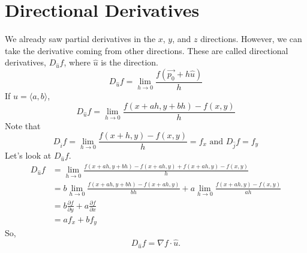 \section{Directional Derivatives}
\noindent
We already saw partial derivatives in the $x$, $y$, and $z$ directions.
However, we can take the derivative coming from other directions.
These are called directional derivatives, $D_{\hat{u}}{f}$, where $\hat{u}$ is the direction.
\begin{equation*}
	D_{\hat{u}}{f} = \lim_{h \to 0}{\frac{f(\vec{p_0} + h\hat{u})}{h}}
\end{equation*}
\noindent
If $\hat{u} = \langle a, b \rangle$, 
\begin{equation*}
	D_{\hat{u}}{f} = \lim_{h \to 0}{\frac{f(x+ah, y+bh) - f(x,y)}{h}}	
\end{equation*}
Note that
\begin{equation*}
	D_{\hat{i}}{f} = \lim_{h \to 0}{\frac{f(x+h, y) - f(x, y)}{h}} = f_x \text{ and } D_{\hat{j}}{f} = f_y	
\end{equation*}
Let's look at $D_{\hat{u}}{f}$.
\begin{align*}
	D_{\hat{u}}{f} &= \lim_{h \to 0}{\frac{f(x+ah, y+bh) - f(x+ah, y) + f(x+ah, y) - f(x, y)}{h}} \\
	&= b\lim_{h \to 0}{\frac{f(x+ah, y+bh)-f(x+ah, y)}{bh}} + a\lim_{h \to 0}{\frac{f(x+ah, y) - f(x, y)}{ah}} \\
	&= b\frac{\partial f}{\partial y} + a\frac{\partial f}{\partial x} \\
	&= af_x + bf_y
\end{align*}
So, 
\begin{equation*}
	D_{\hat{u}}{f} =\nabla f \cdot \hat{u}.
\end{equation*}
